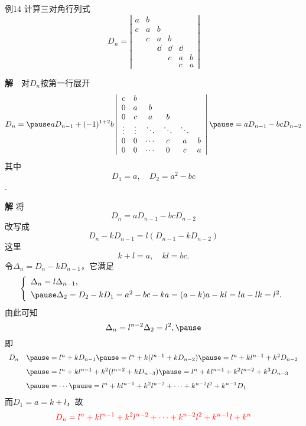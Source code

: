 \begin{frame}
  \begin{footnotesize}
  \begin{exampleblock}{例14}
    计算三对角行列式
    $$
    D_n = \left|
    \begin{array}{cccccc}
      a & b & &&&\\
      c&a&b&&&\\
      &c&a&b&&\\
      &&\dd&\dd&\dd&\\
      &&&c&a&b\\
      &&&&c&a
    \end{array}
    \right|
    $$
  \end{exampleblock}
    \textbf{解}　对$D_n$按第一行展开
    $$
    D_n = \pause aD_{n-1} + (-1)^{1+2} b \left|
    \begin{array}{cccccc}
      c&b&&&&\\
      0&a&b&&&\\
      0&c&a&b&&\\
      \vd&\vd&\dd&\dd&\dd&\\
      0&0&\cd&c&a&b\\
      0&0&\cd&0&c&a
    \end{array}
    \right| \pause = a D_{n-1} - bc D_{n-2}
    $$
    \pause 
    其中$$D_1=a, \quad D_2=a^2-bc$$.
  \end{footnotesize}
    
\end{frame}


\begin{frame}
  \begin{footnotesize}
    \textbf{解}
    将　
    $$D_n = a D_{n-1} - bc D_{n-2}$$
    改写成 \pause
    $$
    D_n - k D_{n-1} = l(D_{n-1} - k D_{n-2})
    $$ \pause
    这里
    $$
    k+l=a, \quad kl = bc.
    $$
    \pause
    令$\Delta_n = D_n-kD_{n-1}$，它满足
    $$
    \left\{
    \begin{array}{l}
      \Delta_n = l\Delta_{n-1},  \\[0.05in] \pause
      \Delta_2 = D_2-kD_1 = a^2-bc - ka = (a-k)a-kl=la-lk=l^2.
    \end{array}    
    \right.
    $$\pause 
    由此可知
    $$
    \Delta_n = l^{n-2} \Delta_2 = l^2, \pause
    $$
    即
    $$
    \begin{array}{rl}
    D_n & \pause = l^n  + k D_{n-1} \pause = l^n  + k (l^{n-1}  + k D_{n-2}) 
    \pause= l^n  + k l^{n-1}  + k^2 D_{n-2} \\[0.1in]
    & \pause=  l^n  + k l^{n-1}  + k^2 (l^{n-2}  + k D_{n-3} )
   \pause = l^n  + k l^{n-1}  + k^2 l^{n-2}  + k^3 D_{n-3} \\[0.1in]
    &\pause = \cd \pause =  l^n  + k l^{n-1}  + k^2 l^{n-2}  + \cd + k^{n-2}l^2 + k^{n-1} D_1
    \end{array}
    $$ \pause
    而$D_1 = a = k+l$，故
    $$
    \textcolor{red}{
    D_n = l^n  + k l^{n-1}  + k^2 l^{n-2}  + \cdots + k^{n-2}l^2 + k^{n-1}l + k^n
    }
    $$
  \end{footnotesize}
\end{frame}
